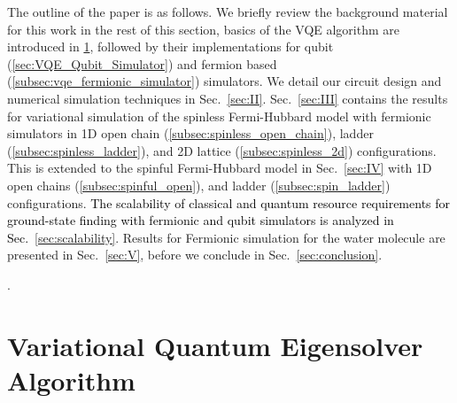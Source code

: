 \documentclass[aps, prx, reprint, superscriptaddress]{revtex4-2}
\begin{document}

The outline of the paper is as follows. We briefly review the background material for this work in the rest of this section, basics of the VQE algorithm are introduced in \ref{sec:VQE}, followed by their implementations for qubit (\ref{sec:VQE_Qubit_Simulator}) and fermion based (\ref{subsec:vqe_fermionic_simulator}) simulators. We detail our circuit design and numerical simulation techniques in Sec.~\ref{sec:II}. Sec.~\ref{sec:III} contains the results for variational simulation of the spinless Fermi-Hubbard model with fermionic simulators in 1D open chain (\ref{subsec:spinless_open_chain}), ladder (\ref{subsec:spinless_ladder}), and 2D lattice (\ref{subsec:spinless_2d}) configurations. This is extended to the spinful Fermi-Hubbard model in Sec.~\ref{sec:IV} with 1D open chains (\ref{subsec:spinful_open}), and ladder (\ref{subsec:spin_ladder}) configurations. \textcolor{black}{The scalability of classical and quantum resource requirements for ground-state finding with fermionic and qubit simulators is analyzed in Sec.~\ref{sec:scalability}}.  Results for Fermionic simulation for the water molecule are presented in Sec.~\ref{sec:V}, before we conclude in Sec.~\ref{sec:conclusion}. 

. 

\section{Variational Quantum Eigensolver Algorithm}
\label{sec:VQE}
\end{document}

